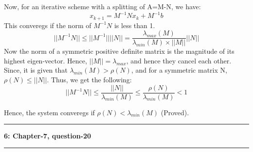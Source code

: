\documentclass{article}
\newcommand\question[2]{\vspace{.25in}\hrule\textbf{#1: #2}\hrule\vspace{.10in}}
\begin{document}
  Now, for an iterative scheme with a splitting of A=M-N, we have: \newline
  \[ x_{k+1} = M^{-1}Nx_k + M^{-1}b \]
  This converegs if the norm of $M^{-1}N$ is less than 1.\newline
  \[ ||M^{-1}N|| \leq ||M^{-1}|| ||N|| =  \dfrac{\lambda_{max}(M)}{\lambda_{min}(M) \times ||M||} ||N|| \]
  Now the norm of a symmetric positive definite matrix is the magnitude of its highest eigen-vector. Hence, $||M|| = \lambda_{max}$, and hence they cancel each other. Since, it is given that $\lambda_{min}(M) > \rho(N)$, and for a symmetric matrix N, $\rho(N) \leq ||N||$. Thus, we get the following: \newline
  \[||M^{-1}N|| \leq \dfrac{||N||}{\lambda_{min}(M)} \leq \dfrac{\rho(N)}{\lambda_{min}(M)} < 1 \]

  Hence, the system converegs if $\rho(N) < \lambda_{min}(M)$ (Proved). \newline



  \question{6}{Chapter-7, question-20}
\end{document}
